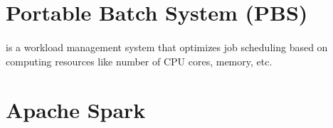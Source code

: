 
\section{Portable Batch System (PBS)}

\paragraph{}
 is a workload management system that optimizes \gls{job}
scheduling based on computing resources like number of CPU cores, memory, etc.


\section{Apache Spark}

\paragraph{}


